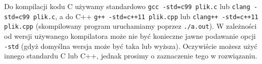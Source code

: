 % 
% 
% 
% 




\dbEntryCheckResults
	Do kompilacji kodu C używamy standardowo \Verb#gcc -std=c99 plik.c# lub \Verb#clang -std=c99 plik.c#, a do C++ \Verb#g++ -std=c++11 plik.cpp# lub \Verb#clang++ -std=c++11 plik.cpp# (skompilowany program uruchamiamy poprzez \Verb#./a.out#).
	W zależności od wersji używanego kompilatora może nie być konieczne jawne podawanie opcji \Verb#-std# (gdyż domyślna wersja może być taka lub wyższa).
	Oczywiście możesz użyć innego standardu C lub C++, jednak prosimy o zaznaczenie tego w rozwiązaniu.
\fi

